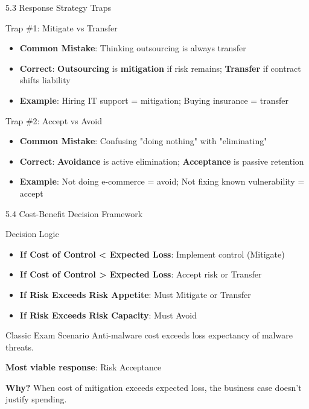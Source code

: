 \documentclass{beamer}
\begin{document}
	\begin{frame}{5.3 Response Strategy Traps}
		\begin{block}{Trap \#1: Mitigate vs Transfer}
			\begin{itemize}
				\item \textbf{Common Mistake}: Thinking outsourcing is always transfer
				\item \textbf{Correct}: \textbf{Outsourcing} is \textbf{mitigation} if risk remains; \textbf{Transfer} if contract shifts liability
				\item \textbf{Example}: Hiring IT support = mitigation; Buying insurance = transfer
			\end{itemize}
		\end{block}
		
		\begin{block}{Trap \#2: Accept vs Avoid}
			\begin{itemize}
				\item \textbf{Common Mistake}: Confusing "doing nothing" with "eliminating"
				\item \textbf{Correct}: \textbf{Avoidance} is active elimination; \textbf{Acceptance} is passive retention
				\item \textbf{Example}: Not doing e-commerce = avoid; Not fixing known vulnerability = accept
			\end{itemize}
		\end{block}
	\end{frame}
	
	\begin{frame}{5.4 Cost-Benefit Decision Framework}
		\begin{block}{Decision Logic}
			\begin{itemize}
				\item \textbf{If Cost of Control < Expected Loss}: Implement control (Mitigate)
				\item \textbf{If Cost of Control > Expected Loss}: Accept risk or Transfer
				\item \textbf{If Risk Exceeds Risk Appetite}: Must Mitigate or Transfer
				\item \textbf{If Risk Exceeds Risk Capacity}: Must Avoid
			\end{itemize}
		\end{block}
		
		\begin{exampleblock}{Classic Exam Scenario}
			Anti-malware cost exceeds loss expectancy of malware threats.
			
			\textbf{Most viable response}: Risk Acceptance
			
			\textbf{Why?} When cost of mitigation exceeds expected loss, the business case doesn't justify spending.
		\end{exampleblock}
	\end{frame}
	
\end{document}
